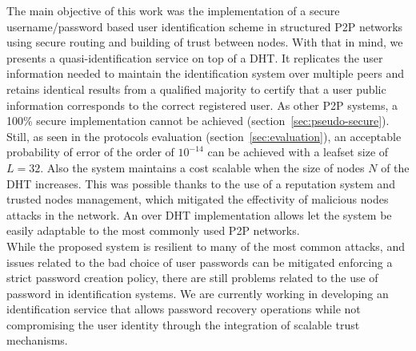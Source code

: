 The main objective of this work was the implementation of a secure
username/password based user identification scheme in structured P2P
networks using secure routing and building of trust between nodes.
With that in mind, we presents a quasi-identification service on top of a DHT. It
replicates the user information needed to maintain the identification system
over multiple peers and retains identical results from a qualified majority to
certify that a user public information corresponds to the correct registered user.
As other P2P
systems, a 100\% secure implementation cannot be achieved
(section~\ref{sec:pseudo-secure}). Still, as seen in the
protocols evaluation (section~\ref{sec:evaluation}), an acceptable probability of error of the order
of $10^{-14}$ can be achieved with a leafset size of $L = 32$. Also the system
maintains a cost scalable when the size of nodes $N$ of the DHT increases.
This was possible thanks to the use of a reputation system and trusted
nodes management, which mitigated the effectivity of malicious nodes attacks in
the network.
An over DHT implementation allows let the system be easily adaptable  to the
most commonly used P2P networks.\\


While the proposed system is resilient to many of the most common attacks,
and issues related to the bad choice of user passwords can be mitigated enforcing a
strict password creation policy, there are still problems related to the use of
password in identification systems.
We are currently working in developing an identification service that
allows password recovery operations while not compromising the user identity
through the integration of scalable trust mechanisms.

